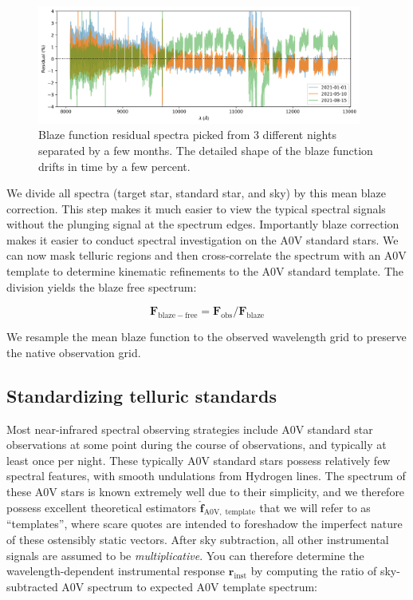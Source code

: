 \documentclass[modern]{aastex631}
\begin{document}
\begin{figure}[ht]
  \centering
  \includegraphics[width=0.95\textwidth]{figures/HPF_blaze_function_variation.png}
\caption{Blaze function residual spectra picked from 3 different nights separated by a few months.  The detailed shape of the blaze function drifts in time by a few percent.}
\label{fig:blaze_variation}
\end{figure}

We divide all spectra (target star, standard star, and sky) by this mean blaze correction.  This step makes it much easier to view the typical spectral signals without the plunging signal at the spectrum edges.  Importantly blaze correction makes it easier to conduct spectral investigation on the A0V standard stars.  We can now mask telluric regions and then cross-correlate the spectrum with an A0V template to determine kinematic refinements to the A0V standard template.  The division yields the blaze free spectrum:

\begin{equation} \label{blaze_correction}
\mathbf{F}_{\mathrm{blaze-free}} = \mathbf{F}_{\mathrm{obs}}/ \mathbf{F}_{\mathrm{blaze}}
\end{equation}

We resample the mean blaze function to the observed wavelength grid to preserve the native observation grid.


\subsection{Standardizing telluric standards}
Most near-infrared spectral observing strategies include A0V standard star observations at some point during the course of observations, and typically at least once per night.  These typically A0V standard stars possess relatively few spectral features, with smooth undulations from Hydrogen lines.  The spectrum of these A0V stars is known extremely well due to their simplicity, and we therefore possess excellent theoretical estimators $\mathbf{\hat{f}}_{\mathrm{A0V,\;template}}$ that we will refer to as ``templates'', where scare quotes are intended to foreshadow the imperfect nature of these ostensibly static vectors.  After sky subtraction, all other instrumental signals are assumed to be \emph{multiplicative}.  You can therefore determine the wavelength-dependent instrumental response $\mathbf{r}_{\mathrm{inst}}$ by computing the ratio of sky-subtracted A0V spectrum to expected A0V template spectrum:
\end{document}
